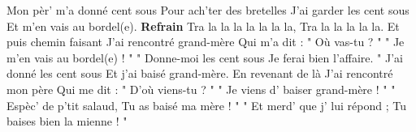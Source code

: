 \footnotemark
[ititle={Mère à papa, La}, ititle={Cent sous, Les}]

\beginsong
Mon pèr' m'a donné cent sous
Pour ach'ter des bretelles
J'ai garder les cent sous
Et m'en vais au bordel(e).
\endverse
\beginchorus
\textbf{Refrain}
Tra la la la la la la la,
Tra la la la la la.
\endchorus
\beginverse
Et puis chemin faisant
J'ai rencontré grand-mère
Qui m'a dit : " Où vas-tu ? "
" Je m'en vais au bordel(e) ! "
\endverse
\beginverse
" Donne-moi les cent sous
Je ferai bien l'affaire. "
J'ai donné les cent sous
Et j'ai baisé grand-mère.
\endverse
\beginverse
En revenant de là
J'ai rencontré mon père
Qui me dit : " D'où viens-tu ? "
" Je viens d' baiser grand-mère ! "
\endverse
\beginverse
" Espèc' de p'tit salaud,
Tu as baisé ma mère ! "
" Et merd' que j' lui répond ;
Tu baises bien la mienne ! "
\endverse
\endsong
